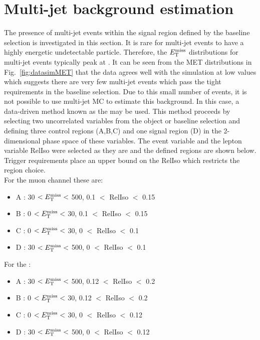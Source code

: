
\section{Multi-jet background estimation}
\label{sec:QCDbackground}
The presence of multi-jet events within the signal region defined by the baseline selection is investigated in this section. It is rare for multi-jet events to have a highly energetic undetectable particle. Therefore, the $E_{\mathrm{T}}^{\text{miss}}$ distributions for multi-jet events typically peak at . It can be seen from the MET distributions in Fig.~\ref{fig:datasimMET} that the data agrees well with the simulation at low values which suggests there are very few multi-jet events which pass the tight requirements in the baseline selection. Due to this small number of events, it is not possible to use multi-jet MC to estimate this background. In this case, a data-driven method known as the  may be used. This method proceeds by selecting two uncorrelated variables from the object or baseline selection and defining three control regions (A,B,C) and one signal region (D) in the 2-dimensional phase space of these variables. The event variable \MET and the lepton variable RelIso were selected as they are  and the defined regions are shown below. Trigger requirements place an upper bound on the RelIso which restricts the region choice.\\
For the muon channel these are:
\begin{itemize}
\setlength\itemsep{0em}
\item A : 30 $<E_{\mathrm{T}}^{\text{miss}}<$ 500, 0.1 $<$ RelIso $<$ 0.15
\item B : 0 $<E_{\mathrm{T}}^{\text{miss}}<$ 30, 0.1 $<$ RelIso $<$ 0.15
\item C : 0 $<E_{\mathrm{T}}^{\text{miss}}<$ 30, 0 $<$ RelIso $<$ 0.1
\item D : 30 $<E_{\mathrm{T}}^{\text{miss}}<$ 500, 0 $<$ RelIso $<$ 0.1
\end{itemize}
For the \eplusjets:
\begin{itemize}
\itemsep0em
\item A : 30 $<E_{\mathrm{T}}^{\text{miss}}<$ 500, 0.12 $<$ RelIso $<$ 0.2
\item B : 0 $<E_{\mathrm{T}}^{\text{miss}}<$ 30, 0.12 $<$ RelIso $<$ 0.2
\item C : 0 $<E_{\mathrm{T}}^{\text{miss}}<$ 30, 0 $<$ RelIso $<$ 0.12
\item D : 30 $<E_{\mathrm{T}}^{\text{miss}}<$ 500, 0 $<$ RelIso $<$ 0.12
\end{itemize}

